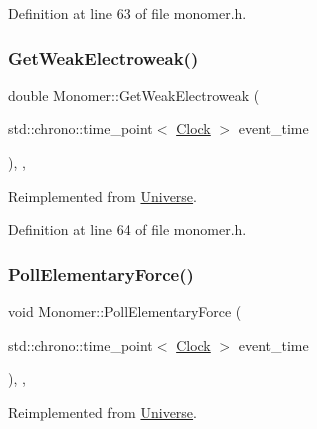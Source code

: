 Definition at line 63 of file monomer.\+h.

\mbox{\label{class_monomer_aec6e42dde40c5b3142fab880eabb346a}} 
\subsubsection{\texorpdfstring{Get\+Weak\+Electroweak()}{GetWeakElectroweak()}}
{\footnotesize\ttfamily double Monomer\+::\+Get\+Weak\+Electroweak (\begin{DoxyParamCaption}\item[{std\+::chrono\+::time\+\_\+point$<$ \hyperlink{universe_8h_a0ef8d951d1ca5ab3cfaf7ab4c7a6fd80}{Clock} $>$}]{event\+\_\+time }\end{DoxyParamCaption})\hspace{0.3cm}{\ttfamily [inline]}, {\ttfamily [final]}, {\ttfamily [virtual]}}



Reimplemented from \hyperlink{class_universe_a645299738e6b798a037f2a15a2e7cf4d}{Universe}.



Definition at line 64 of file monomer.\+h.

\mbox{\label{class_monomer_a5b2375df1e19abdf6045c475d2ac23ca}} 
\subsubsection{\texorpdfstring{Poll\+Elementary\+Force()}{PollElementaryForce()}}
{\footnotesize\ttfamily void Monomer\+::\+Poll\+Elementary\+Force (\begin{DoxyParamCaption}\item[{std\+::chrono\+::time\+\_\+point$<$ \hyperlink{universe_8h_a0ef8d951d1ca5ab3cfaf7ab4c7a6fd80}{Clock} $>$}]{event\+\_\+time }\end{DoxyParamCaption})\hspace{0.3cm}{\ttfamily [inline]}, {\ttfamily [final]}, {\ttfamily [virtual]}}



Reimplemented from \hyperlink{class_universe_a0c485c504542409cbb5cfd8543c35b11}{Universe}.



